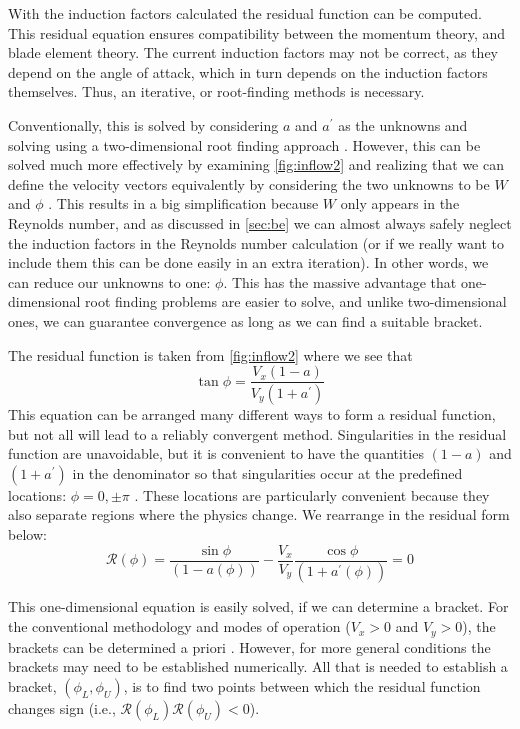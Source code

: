 With the induction factors calculated the residual function can be computed. This residual equation ensures compatibility between the momentum theory, and blade element theory. The current induction factors may not be correct, as they depend on the angle of attack, which in turn depends on the induction factors themselves.  Thus, an iterative, or root-finding methods is necessary.

Conventionally, this is solved by considering $a$ and $a^\prime$ as the unknowns and solving using a two-dimensional root finding approach \cite{Manwell2009-Wind-Energy,Hansen2008-Aerodynamics-Wind,Burton2011-Wind-Energy}.  However, this can be solved much more effectively by examining \cref{fig:inflow2} and realizing that we can define the velocity vectors equivalently by considering the two unknowns to be $W$ and $\phi$ \cite{Ning2014-Simple-Solution}.  This results in a big simplification because $W$ only appears in the Reynolds number, and as discussed in \cref{sec:be} we can almost always safely neglect the induction factors in the Reynolds number calculation (or if we really want to include them this can be done easily in an extra iteration). In other words, we can reduce our unknowns to one: $\phi$.  This has the massive advantage that one-dimensional root finding problems are easier to solve, and unlike two-dimensional ones, we can guarantee convergence as long as we can find a suitable bracket.

The residual function is taken from \cref{fig:inflow2} where we see that
\[\tan\phi = \frac{V_x (1 - a)}{V_y (1 + a^\prime)}\]
This equation can be arranged many different ways to form a residual function, but not all will lead to a reliably convergent method. Singularities in the residual function are unavoidable, but it is convenient to have the quantities $(1 - a)$ and $(1 + a^\prime)$ in the denominator so that singularities occur at the predefined locations: $\phi = 0, \pm\pi$ \cite{Ning2014-Simple-Solution}. These locations are particularly convenient because they also separate regions where the physics change.  We rearrange in the residual form below:
\begin{equation}
    \mathcal{R}(\phi) = \frac{\sin\phi}{(1 - a(\phi))} - \frac{V_x}{V_y} \frac{\cos\phi}{(1 + a^\prime(\phi))} = 0
    \label{eq:residual}
\end{equation}

This one-dimensional equation is easily solved, if we can determine a bracket.  For the conventional methodology and modes of operation ($V_x > 0$ and $V_y > 0$), the brackets can be determined a priori \cite{Ning2014-Simple-Solution}.  However, for more general conditions the brackets may need to be established numerically.  All that is needed to establish a bracket, $(\phi_L, \phi_U)$, is to find two points between which the residual function changes sign (i.e., $\mathcal{R}(\phi_L)\mathcal{R}(\phi_U) < 0$).


